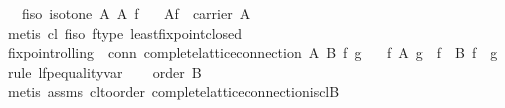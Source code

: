 \begin{isabellebody}
\ \ \ f{}iso{}\ {}isotone\ A\ A\ f{}\isanewline
\ \ \ {}{}\isactrlbsub A\isactrlesub f\ {}\ carrier\ A{}\isanewline
%
\isadelimproof
\ \ %
\endisadelimproof
%
\isatagproof
{}\isamarkupfalse%
\ {}metis\ cl\ f{}iso\ f{}type\ least{}fixpoint{}closed{}%
\endisatagproof
{\isafoldproof}%
%
\isadelimproof
\isanewline
%
\endisadelimproof
\isanewline
{}\isamarkupfalse%
\ fixpoint{}rolling{}\ \ conn{}\ {}complete{}lattice{}connection\ A\ B\ f\ g{}\isanewline
\ \ \ {}f\ {}{}\isactrlbsub A\isactrlesub \ {}g\ {}\ f{}{}\ {}\ {}\isactrlbsub B\isactrlesub \ {}f\ {}\ g{}{}\isanewline
%
\isadelimproof
%
\endisadelimproof
%
\isatagproof
{}\isamarkupfalse%
\ {}rule\ lfp{}equality{}var{}\isanewline
\ \ \isamarkupfalse%
\ {}order\ B{}\isanewline
\ \ \ \ \isamarkupfalse%
\ {}metis\ assms\ cl{}to{}order\ complete{}lattice{}connection{}is{}cl{}B{}\isanewline

\end{isabellebody}
